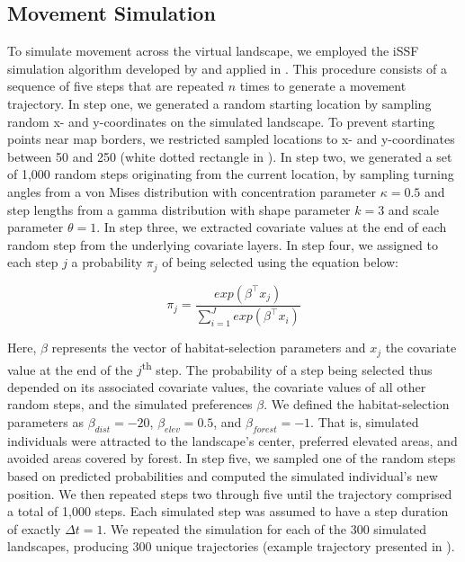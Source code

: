 \documentclass[abstract=on,10pt,a4paper,bibliography=totocnumbered]{article}
\begin{document}
\subsection{Movement Simulation}
\label{MovementSimulation}
To simulate movement across the virtual landscape, we employed the iSSF
simulation algorithm developed by \citet{Signer.2017} and applied in
\citet{Hofmann.2023}. This procedure consists of a sequence of five steps that
are repeated $n$ times to generate a movement trajectory. In step one, we
generated a random starting location by sampling random x- and y-coordinates on
the simulated landscape. To prevent starting points near map borders, we
restricted sampled locations to x- and y-coordinates between 50 and 250 (white
dotted rectangle in ). In step two, we generated a set of 1,000
random steps originating from the current location, by sampling turning angles
from a von Mises distribution with concentration parameter $\kappa = 0.5$ and
step lengths from a gamma distribution with shape parameter $k = 3$ and scale
parameter $\theta = 1$. In step three, we extracted covariate values at the end
of each random step from the underlying covariate layers. In step four, we
assigned to each step $j$ a probability $\pi_j$ of being selected using the
equation below:

\begin{equation}
\label{EQ2}
  \pi_j =
  \frac{exp(\beta^\top x_j)}{\sum_{i = 1}^J exp(\beta^\top x_i)} %
\end{equation}

\noindent Here, $\beta$ represents the vector of habitat-selection parameters
and $x_j$ the covariate value at the end of the $j$\textsuperscript{th} step.
The probability of a step being selected thus depended on its associated
covariate values, the covariate values of all other random steps, and the
simulated preferences $\beta$. We defined the habitat-selection parameters as
$\beta_{dist} = -20$, $\beta_{elev} = 0.5$, and $\beta_{forest} = -1$. That is,
simulated individuals were attracted to the landscape's center, preferred
elevated areas, and avoided areas covered by forest. In step five, we sampled
one of the random steps based on predicted probabilities and computed the
simulated individual's new position. We then repeated steps two through five
until the trajectory comprised a total of 1,000 steps. Each simulated step was
assumed to have a step duration of exactly $\Delta t = 1$. We repeated the
simulation for each of the 300 simulated landscapes, producing 300 unique
trajectories (example trajectory presented in ).
\end{document}
